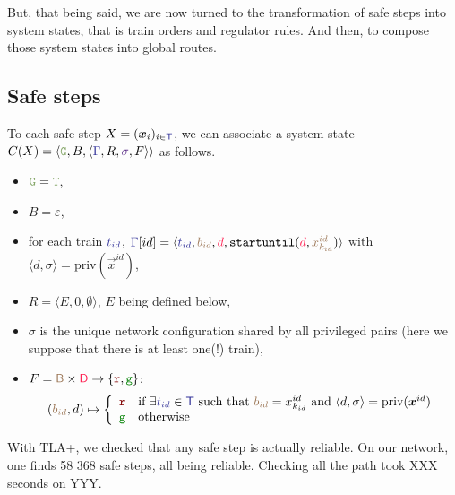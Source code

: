 \documentclass[runningheads]{llncs}
\newcommand{\tuple}[1]{\ensuremath{\langle #1\rangle}}
\newcommand{\directions}{\dirFmt{\mathsf{D}}}
\newcommand{\dirFmt}[1]{{\color{dircolor} #1}}
\newcommand{\posFmt}[1]{{\color{poscolor}{#1}}}
\newcommand{\blocks}{{\posFmt{\mathsf{B}}}}
\newcommand{\bid}[1]{\ensuremath{\posFmt{b_{#1}}}}
\newcommand{\swFmt}[1]{{\color{swcolor}{#1}}}
\newcommand{\switches}{\ensuremath{\swFmt{\sigma}}}
\newcommand{\trainFmt}[1]{{\color{traincolor} #1}}
\newcommand{\trainTuple}[4]{\langle \trainFmt{#1}, \posFmt{#2}, \dirFmt{#3}, #4 \rangle}
\newcommand{\trainSeq}{\trainFmt{\Gamma\xspace}}
\newcommand{\trains}{{\trainFmt{\mathsf{T}}}}
\newcommand{\tid}[1]{\ensuremath{\trainFmt{t_{#1}}}}
\newcommand{\su}[2]{{\mbox{$\mathtt{startuntil}(\dirFmt{#1}, \posFmt{#2})$}}\xspace}
\newcommand{\regulator}{\ensuremath{R}}
\newcommand{\sigred}{{\mbox{${\color{red!50!black}\mathtt{r}}$}}\xspace}
\newcommand{\siggreen}{{\mbox{${\color{green!50!black}\mathtt{g}}$}}\xspace}
\newcommand{\signals}{\ensuremath{F}}
\newcommand{\stateTuple}[4]{\tuple{#1, #2, #3, #4}}
\newcommand{\guardFmt}[1]{{\color{guardcolor} \ensuremath{\mathtt{#1}}}}
\newcommand{\guardT}{\guardFmt{T}}
\newcommand{\guardG}{\guardFmt{G}}
\newcommand{\bufferFmt}[1]{#1}
\newcommand{\emptyList}{\ensuremath{\varepsilon}}
\newcommand{\redTuple}[3]{\ensuremath{\tuple{#1, #2, #3}}}
\begin{document}
 But, that being said, we are now turned to the transformation of safe steps into system states, that is train orders and regulator rules. And then, to compose those system states into global routes. 

\subsection{Safe steps}
\label{sec:experiments:4}

To each safe step $X = (\vec{x}_i)_{i \in \trains}$, we can associate a system state $C(X) = \redTuple{\guardG}{\bufferFmt{B}}{\stateTuple{\trainSeq}{\regulator}{\switches}{\signals}} $ as follows. 
\begin{itemize}
\item $\guardG = \guardT$,
\item $\bufferFmt{B} = \emptyList$,
\item for each train $\tid{id}$, $\trainSeq[id] = \trainTuple{\tid{id}}{\bid{id}}{d}{\su{d}{x^{id}_{k_{id}}}}$ with $\langle d,\sigma\rangle = \text{priv}(\vec{x}^{id})$,
\item $R = \langle E, 0, \emptyset\rangle$, $E$ being defined below,
\item $\sigma$ is the unique network configuration shared by all privileged pairs (here we suppose that there is at least one(!) train),
\item $F = \blocks \times \directions \to \{\sigred, \siggreen \}$:
$$
(\bid{id}, d) \mapsto \left \{ \begin{array}{ll}
\sigred & \text{if } \exists \tid{id} \in \trains \text{ such that }  \bid{id} = x^{id}_{k_{id}} \text{ and } \langle d,\sigma\rangle = \text{priv}(\vec{x}^{id}) \\
\siggreen & \text{otherwise}
\end{array} \right.$$
\end{itemize}


With TLA+, we checked that any safe step is actually reliable.  On our network, one finds 58 368 safe steps, all being reliable. Checking all the path took XXX seconds on YYY. 

\end{document}

